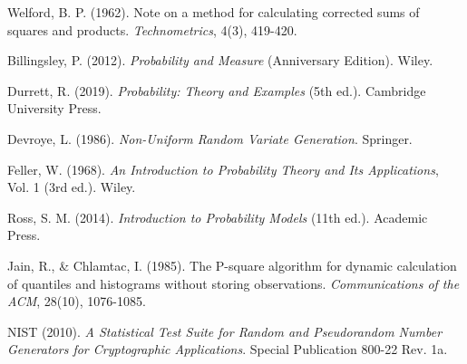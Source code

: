 \documentclass[12pt,a4paper]{article}
\begin{document}
\begin{enumerate}[label={[\arabic*]}]
\item Welford, B. P. (1962). Note on a method for calculating corrected sums of squares and products. \textit{Technometrics}, 4(3), 419-420.
\item Billingsley, P. (2012). \textit{Probability and Measure} (Anniversary Edition). Wiley.
\item Durrett, R. (2019). \textit{Probability: Theory and Examples} (5th ed.). Cambridge University Press.
\item Devroye, L. (1986). \textit{Non-Uniform Random Variate Generation}. Springer.
\item Feller, W. (1968). \textit{An Introduction to Probability Theory and Its Applications}, Vol. 1 (3rd ed.). Wiley.
\item Ross, S. M. (2014). \textit{Introduction to Probability Models} (11th ed.). Academic Press.
\item Jain, R., \& Chlamtac, I. (1985). The P-square algorithm for dynamic calculation of quantiles and histograms without storing observations. \textit{Communications of the ACM}, 28(10), 1076-1085.
\item NIST (2010). \textit{A Statistical Test Suite for Random and Pseudorandom Number Generators for Cryptographic Applications}. Special Publication 800-22 Rev. 1a.
\end{enumerate}
\end{document}
